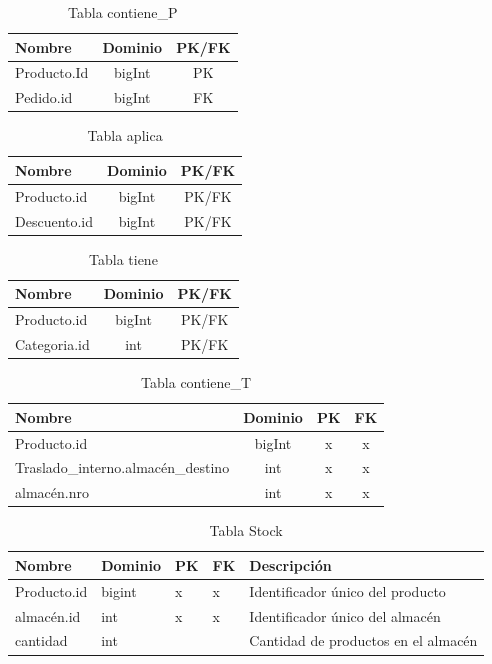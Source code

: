 \documentclass[10pt, a4paper,openany]{report}
\begin{document}
\begin{table}[h]
\centering
\begin{tabular}{|l|c|c|}
\hline
\textbf{Nombre} & \textbf{Dominio} & \textbf{PK/FK} \\
\hline
Producto.Id & bigInt & PK \\
\hline
Pedido.id & bigInt & FK \\
\hline
\end{tabular}
\caption{Tabla contiene\_P}
\end{table}

\begin{table}[h]
\centering
\begin{tabular}{|l|c|c|}
\hline
\textbf{Nombre} & \textbf{Dominio} & \textbf{PK/FK} \\
\hline
Producto.id & bigInt & PK/FK \\
\hline
Descuento.id & bigInt & PK/FK \\
\hline
\end{tabular}
\caption{Tabla aplica}
\end{table}

\begin{table}[h]
\centering
\begin{tabular}{|l|c|c|}
\hline
\textbf{Nombre} & \textbf{Dominio} & \textbf{PK/FK} \\
\hline
Producto.id & bigInt & PK/FK \\
\hline
Categoria.id & int & PK/FK \\
\hline
\end{tabular}
\caption{Tabla tiene}
\end{table}

\begin{table}[h]
\centering
\begin{tabular}{|l|c|c|c|}
\hline
\textbf{Nombre} & \textbf{Dominio} & \textbf{PK} & \textbf{FK} \\
\hline
Producto.id & bigInt & x &x \\
\hline
Traslado\_interno.almacén\_destino & int & x & x\\
\hline
almacén.nro & int & x& x \\
\hline
\end{tabular}
\caption{Tabla contiene\_T}
\end{table}

\begin{table}[h]
\centering
\begin{tabular}{|l|p{1.5cm}|p{0.5cm}|p{0.5cm}|p{3cm}|}
\hline
\textbf{Nombre} &
\textbf{Dominio} &
\textbf{PK} &
\textbf{FK} &
\textbf{Descripción} \\
\hline
Producto.id & bigint & x &x & Identificador único del producto \\
\hline
almacén.id & int & x & x & Identificador único del almacén \\
\hline
cantidad & int & & & Cantidad de productos en el almacén \\
\hline
\end{tabular}
\caption{Tabla Stock}
\end{table} 
\end{document}
